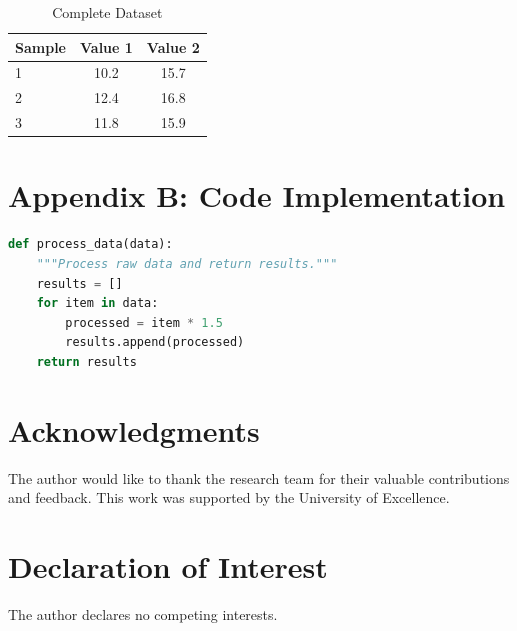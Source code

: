 \documentclass{Seka}
\begin{document}
\begin{table}[h]
\centering
\caption{Complete Dataset}
\label{app:table}
\begin{tabular}{lcc}
\toprule
\textbf{Sample} & \textbf{Value 1} & \textbf{Value 2} \\
\midrule
1 & 10.2 & 15.7 \\
2 & 12.4 & 16.8 \\
3 & 11.8 & 15.9 \\
\bottomrule
\end{tabular}
\end{table}

\section{Appendix B: Code Implementation}
\label{app:code}

\begin{code}
\begin{lstlisting}[language=Python]
def process_data(data):
    """Process raw data and return results."""
    results = []
    for item in data:
        processed = item * 1.5
        results.append(processed)
    return results
\end{lstlisting}
\caption{Complete processing function}
\end{code}


\section*{Acknowledgments}

The author would like to thank the research team for their valuable contributions and feedback. This work was supported by the University of Excellence.


\section*{Declaration of Interest}

The author declares no competing interests.


\printbibliography
\end{document}
